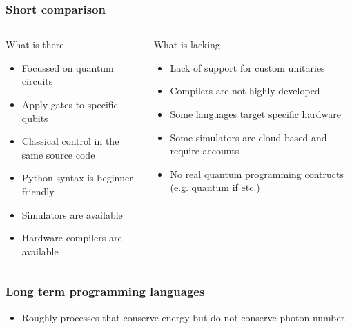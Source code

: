 \documentclass{beamer}
\begin{document}
\begin{frame}
\frametitle{Short comparison}
\begin{columns}
    \begin{block}{What is there}
    \begin{itemize}
        \item Focussed on quantum circuits
        \item Apply gates to specific qubits
        \item Classical control in the same source code
        \item Python syntax is beginner friendly
        \item Simulators are available
        \item Hardware compilers are available
    \end{itemize}
    \end{block}
    \begin{block}{What is lacking}
        \begin{itemize}
            \item Lack of support for custom unitaries
            \item Compilers are not highly developed
            \item Some languages target specific hardware
            \item Some simulators are cloud based and require accounts
            \item No real quantum programming contructs (e.g. quantum if etc.)
        \end{itemize}
        \end{block}
\end{columns}
\end{frame}
\begin{frame}
\frametitle{Long term programming languages}
\begin{itemize} 
    \item Roughly processes that conserve energy but do not conserve photon number. 
\end{itemize}
\end{frame}
\end{document}
